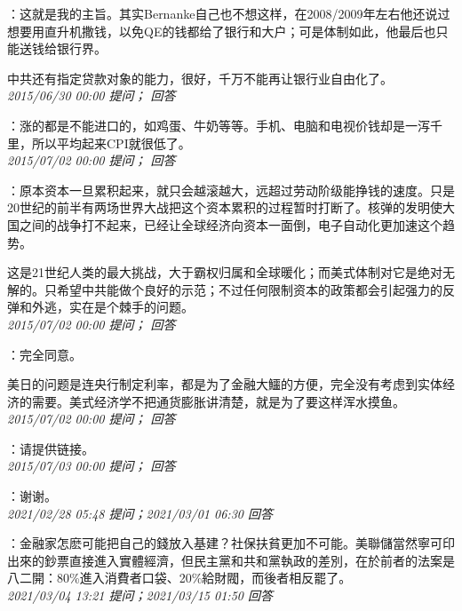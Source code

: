 \documentclass[twocolumn]{ctexart}
\begin{document}
：这就是我的主旨。其实Bernanke自己也不想这样，在2008/2009年左右他还说过想要用直升机撒钱，以免QE的钱都给了银行和大户；可是体制如此，他最后也只能送钱给银行界。

中共还有指定贷款对象的能力，很好，千万不能再让银行业自由化了。\\

\textit{\hfill\noindent\small 2015/06/30 00:00 提问； 回答}

：涨的都是不能进口的，如鸡蛋、牛奶等等。手机、电脑和电视价钱却是一泻千里，所以平均起来CPI就很低了。\\

\textit{\hfill\noindent\small 2015/07/02 00:00 提问； 回答}

：原本资本一旦累积起来，就只会越滚越大，远超过劳动阶级能挣钱的速度。只是20世纪的前半有两场世界大战把这个资本累积的过程暂时打断了。核弹的发明使大国之间的战争打不起来，已经让全球经济向资本一面倒，电子自动化更加速这个趋势。

这是21世纪人类的最大挑战，大于霸权归属和全球暖化；而美式体制对它是绝对无解的。只希望中共能做个良好的示范；不过任何限制资本的政策都会引起强力的反弹和外逃，实在是个棘手的问题。\\

\textit{\hfill\noindent\small 2015/07/02 00:00 提问； 回答}

：完全同意。

美日的问题是连央行制定利率，都是为了金融大鱷的方便，完全没有考虑到实体经济的需要。美式经济学不把通货膨胀讲清楚，就是为了要这样浑水摸鱼。\\

\textit{\hfill\noindent\small 2015/07/02 00:00 提问； 回答}

：请提供链接。\\

\textit{\hfill\noindent\small 2015/07/03 00:00 提问； 回答}

：谢谢。\\

\textit{\hfill\noindent\small 2021/02/28 05:48 提问；2021/03/01 06:30 回答}

：金融家怎麽可能把自己的錢放入基建？社保扶貧更加不可能。美聯儲當然寧可印出來的鈔票直接進入實體經濟，但民主黨和共和黨執政的差別，在於前者的法案是八二開：80\%進入消費者口袋、20\%給財閥，而後者相反罷了。
\\

\textit{\hfill\noindent\small 2021/03/04 13:21 提问；2021/03/15 01:50 回答}
\end{document}
